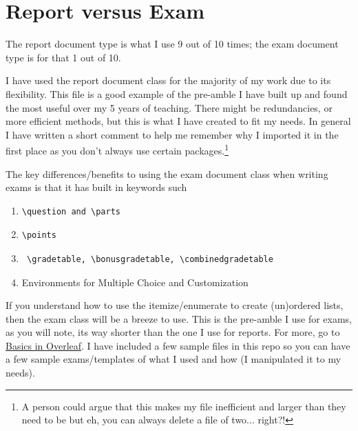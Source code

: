 \documentclass[12pt, letterpaper]{report}
\newcommand{\0}{\emptyset}
\theoremstyle{theorem}
\theoremstyle{definition}
\theoremstyle{definition}
\theoremstyle{definition}
\theoremstyle{definition}
\theoremstyle{theorem}
\theoremstyle{theorem}
\theoremstyle{remark}
\begin{document}
\section{Report versus Exam}

The report document type is what I use 9 out of 10 times; the exam document type is for that 1 out of 10.

I have used the report document class for the majority of my work due to its flexibility.  This file is a good example of the pre-amble I have built up and found the most useful over my 5 years of teaching.  There might be redundancies, or more efficient methods, but this is what I have created to fit my needs.  In general I have written a short comment to help me remember why I imported it in the first place as you don't always use certain packages.\footnote{A person could argue that this makes my file inefficient and larger than they need to be but eh, you can always delete a file of two... right?! \color{red}{(Also, this is how you include footnotes as well as color in your text.)}}

The key differences/benefits to using the exam document class when writing exams is that it has built in keywords such
	\begin{enumerate}
		\item \begin{verbatim}\question and \parts \end{verbatim}
		\item \begin{verbatim}\points \end{verbatim}
		\item \begin{verbatim} \gradetable, \bonusgradetable, \combinedgradetable \end{verbatim}
		\item Environments for Multiple Choice and Customization
	\end{enumerate}

If you understand how to use the itemize/enumerate to create (un)ordered lists, then the exam class will be a breeze to use.  This is the pre-amble I use for exams, as you will note, its way shorter than the one I use for reports. For more, go to \href{https://www.overleaf.com/learn/latex/Typesetting_exams_in_LaTeX}{Basics in Overleaf}.  I have included a few sample files in this repo so you can have a few sample exams/templates of what I used and how (I manipulated it to my needs).
\end{document}
